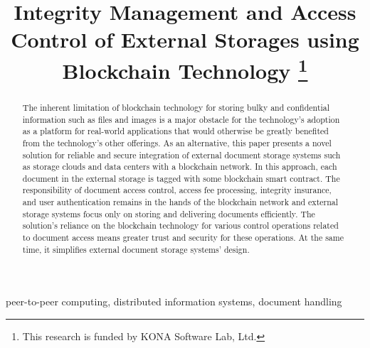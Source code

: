 \documentclass[conference]{IEEEtran}
\begin{document}
\title{Integrity Management and Access Control of External Storages using Blockchain Technology 
	\thanks{This research is funded by KONA Software Lab, Ltd.}
}

\author{
	\and
}
\maketitle

\begin{abstract}
The inherent limitation of blockchain technology for storing bulky and confidential information such as files and images is a major obstacle for the technology's adoption as a platform for real-world applications that would otherwise be greatly benefited from the technology's other offerings. As an alternative, this paper presents a novel solution for reliable and secure integration of external document storage systems such as storage clouds and data centers with a blockchain network. In this approach, each document in the external storage is tagged with some blockchain smart contract. The responsibility of document access control, access fee processing, integrity insurance, and user authentication remains in the hands of the blockchain network and external storage systems focus only on storing and delivering documents efficiently. The solution's reliance on the blockchain technology for various control operations related to document access means greater trust and security for these operations. At the same time, it simplifies external document storage systems' design.    
\end{abstract}

\begin{IEEEkeywords}
peer-to-peer computing, distributed information systems, document handling  
\end{IEEEkeywords}








             

       



 


\end{document}
